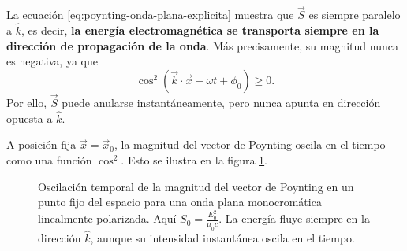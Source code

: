 \documentclass[../main.tex]{subfiles}
\begin{document}
La ecuación \eqref{eq:poynting-onda-plana-explicita} muestra que \(\vec S\) es siempre paralelo a \(\hat k\), es decir, \textbf{la energía electromagnética se transporta siempre en la dirección de propagación de la onda}. Más precisamente, su magnitud nunca es negativa, ya que
\begin{equation*}
    \cos^2\!\left(\vec k\cdot\vec x-\omega t+\phi_0\right)\geq 0.
\end{equation*}
Por ello, \(\vec S\) puede anularse instantáneamente, pero nunca apunta en dirección opuesta a \(\hat k\).

A posición fija \(\vec x=\vec x_0\), la magnitud del vector de Poynting oscila en el tiempo como una función \(\cos^2\). Esto se ilustra en la figura \ref{fig:poynting-cos2-tiempo}.

\begin{figure}[ht]
    \centering
    \caption{Oscilación temporal de la magnitud del vector de Poynting en un punto fijo del espacio para una onda plana monocromática linealmente polarizada. Aquí \(S_0=\frac{E_0^2}{\mu_0 c}\). La energía fluye siempre en la dirección \(\hat k\), aunque su intensidad instantánea oscila en el tiempo.}
    \label{fig:poynting-cos2-tiempo}
\end{figure}
\end{document}
